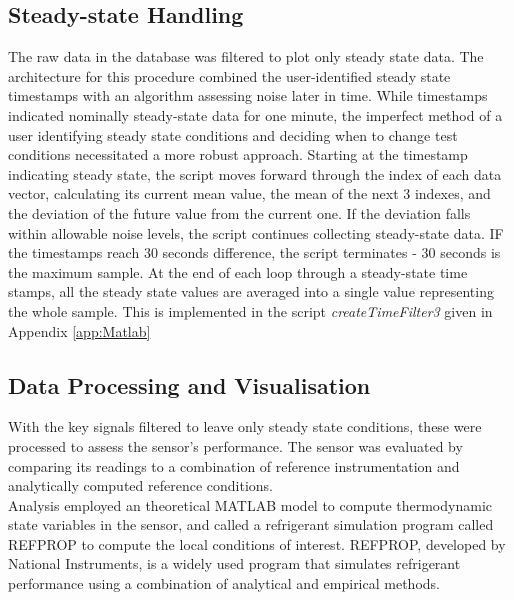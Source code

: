\documentclass{report}
\begin{document}
\subsection{Steady-state Handling}
The raw data in the database was filtered to plot only steady state data. The architecture for this procedure combined the user-identified steady state timestamps with an algorithm assessing noise later in time. While timestamps indicated nominally steady-state data for one minute, the imperfect method of a user identifying steady state conditions and deciding when to change test conditions necessitated a more robust approach. Starting at the timestamp indicating steady state, the script moves forward through the index of each data vector, calculating its current mean value, the mean of the next 3 indexes, and the deviation of the future value from the current one. If the deviation falls within allowable noise levels, the script continues collecting steady-state data. IF the timestamps reach 30 seconds difference, the script terminates - 30 seconds is the maximum sample. At the end of each loop through a steady-state time stamps, all the steady state values are averaged into a single value representing the whole sample. This is implemented in the script \textit{createTimeFilter3} given in Appendix \ref{app:Matlab} 
\subsection{Data Processing and Visualisation}
With the key signals filtered to leave only steady state conditions, these were processed to assess the sensor's performance. The sensor was evaluated by comparing its readings to a combination of reference instrumentation and analytically computed reference conditions. \\
Analysis employed an theoretical MATLAB model to compute thermodynamic state variables in the sensor, and called a refrigerant simulation program called REFPROP to compute the local conditions of interest. %
REFPROP, developed by National Instruments, is a widely used program that simulates refrigerant performance using a combination of analytical and empirical methods. %
\end{document}
